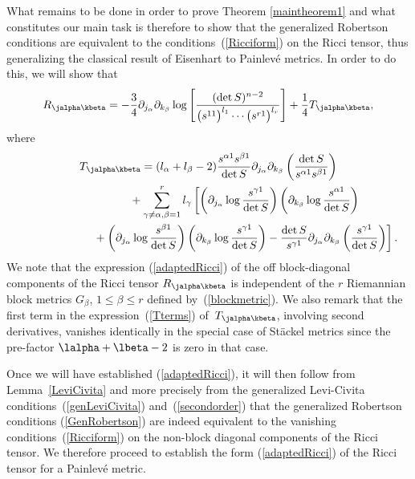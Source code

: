 What remains to be done in order to prove Theorem \ref{maintheorem1} and what constitutes our main task is therefore to show that the generalized Robertson conditions are equivalent to the conditions~(\ref{Ricciform}) on the Ricci tensor, thus generalizing the classical result of Eisenhart \cite{Eis1934} to Painlev\'e metrics. In order to do this, we will show that
\begin{gather}\label{adaptedRicci}
R_{\jalpha \kbeta}=-\frac{3}{4}\partial_{j_{\alpha}}\partial_{k_{\beta}}\log\left[\frac{(\det S)^{n-2}}{\big(s^{11}\big)^{l_{1}}\cdots \big(s^{r1}\big)^{l_{r}}}\right] + \frac{1}{4}T_{\jalpha \kbeta},
\end{gather}
where
\begin{gather}
T_{\jalpha \kbeta} =(l_{\alpha}+l_{\beta}-2)\frac{s^{\alpha 1}s^{\beta 1}}{\det S}\partial_{j_{\alpha}}\partial_{k_{\beta}}\left(\frac{\det S}{s^{\alpha 1}s^{\beta 1}}\right)\nonumber\\
\hphantom{T_{\jalpha \kbeta} =}{} +\sum_{\gamma\neq \alpha,\beta=1}^{r}l_{\gamma}\left[\left(\partial_{j_{\alpha}}\log\frac{s^{\gamma 1}}{\det S}\right)\left(\partial_{k_{\beta}}\log\frac{s^{\alpha 1}}{\det S}\right)\right.\nonumber\\
\left.\hphantom{T_{\jalpha \kbeta} =}{}+\left(\partial_{j_{\alpha}}\log\frac{s^{\beta 1}}{\det S}\right)\left(\partial_{k_{\beta}}\log\frac{s^{\gamma 1}}{\det S}\right)
-\frac{\det S}{s^{\gamma 1}}\partial_{j_{\alpha}}\partial_{k_{\beta}}\left(\frac{s^{\gamma 1}}{\det S}\right)\right].\label{Tterms}
\end{gather}
We note that the expression (\ref{adaptedRicci}) of the off block-diagonal components of the Ricci tensor $R_{\jalpha \kbeta}$ is independent of the $r$ Riemannian block metrics $G_{\beta}$, $1\leq \beta \leq r$ defined by~(\ref{blockmetric}). We also remark that the first term in the expression~(\ref{Tterms}) of~$T_{\jalpha \kbeta}$, involving second derivatives, vanishes identically in the special case of St\"ackel metrics since the pre-factor $\lalpha+\lbeta-2$ is zero in that case.

Once we will have established (\ref{adaptedRicci}), it will then follow from Lemma~\ref{LeviCivita} and more precisely from the generalized Levi-Civita conditions~(\ref{genLeviCivita}) and~(\ref{secondorder}) that the generalized Robertson conditions (\ref{GenRobertson}) are indeed equivalent to the vanishing conditions~(\ref{Ricciform}) on the non-block diagonal components of the Ricci tensor. We therefore proceed to establish the form (\ref{adaptedRicci}) of the Ricci tensor for a Painlev\'e metric.

